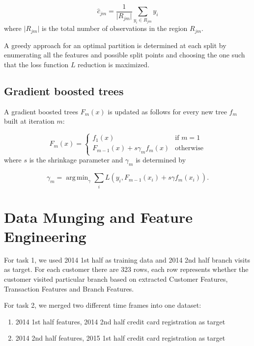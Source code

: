 \documentclass[a4paper]{llncs}
\DeclareMathOperator*{\argmin}{arg\,min}
\begin{document}
\begin{equation}
\hat{c}_{jm} = \frac{1}{\lvert R_{jm} \lvert} \sum_{y_i \in R_{jm}} y_i
\end{equation}
where $\lvert R_{jm} \lvert$ is the total number of observations in the region $R_{jm}$.

A greedy approach for an optimal partition is determined at each split by enumerating all the features and possible split points
 and choosing the one such that the loss function $L$ reduction is maximized.

\subsection{Gradient boosted trees}
A gradient boosted trees $F_m(x)$ is updated as follows for every new tree $f_m$ built at iteration $m$:

\begin{equation}
F_m(x) =
\begin{cases}
    f_1(x)                                 & \text{if } m = 1\\
    F_{m-1}(x) + s \gamma_m f_m(x)         & \text{otherwise}
\end{cases}
\end{equation}
where $s$ is the shrinkage parameter and $\gamma_{m}$ is determined by

\begin{equation}
\gamma_m = \argmin_\gamma \sum_{i} L(y_i, F_{m-1}(x_i) + s \gamma f_m(x_i)).
\end{equation}


\section{Data Munging and Feature Engineering}
For task 1, we used 2014 1st half as training data and 2014 2nd half branch visits as target.
 For each customer there are 323 rows, each row represents whether the customer visited particular branch based on extracted Customer Features,
 Transaction Features and Branch Features.

For task 2, we merged two different time frames into one dataset:

\begin{enumerate}
\item 2014 1st half features, 2014 2nd half credit card registration as target

\item 2014 2nd half features, 2015 1st half credit card registration as target
\end{enumerate}
\end{document}
